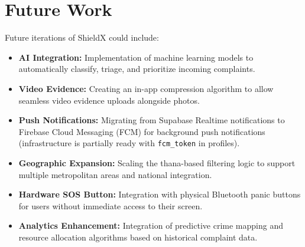 \documentclass[12pt, a4paper, twoside]{report}
\begin{document}
\section{Future Work}
Future iterations of ShieldX could include:
\begin{itemize}[label={}, itemsep=1em]
    \item \textbf{AI Integration:} Implementation of machine learning models to automatically classify, triage, and prioritize incoming complaints.
    \item \textbf{Video Evidence:} Creating an in-app compression algorithm to allow seamless video evidence uploads alongside photos.
    \item \textbf{Push Notifications:} Migrating from Supabase Realtime notifications to Firebase Cloud Messaging (FCM) for background push notifications (infrastructure is partially ready with \texttt{fcm\_token} in profiles).
    \item \textbf{Geographic Expansion:} Scaling the thana-based filtering logic to support multiple metropolitan areas and national integration.
    \item \textbf{Hardware SOS Button:} Integration with physical Bluetooth panic buttons for users without immediate access to their screen.
    \item \textbf{Analytics Enhancement:} Integration of predictive crime mapping and resource allocation algorithms based on historical complaint data.
\end{itemize}
\end{document}
